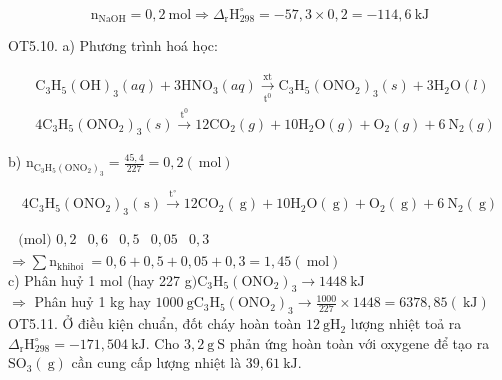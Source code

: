 \documentclass[10pt]{article}
\begin{document}
$$
\mathrm{n}_{\mathrm{NaOH}}=0,2 \mathrm{~mol} \Rightarrow \Delta_{\mathrm{r}} \mathrm{H}_{298}^{\circ}=-57,3 \times 0,2=-114,6 \mathrm{~kJ}
$$

OT5.10. a) Phương trình hoá học:

$$
\begin{aligned}
& \mathrm{C}_{3} \mathrm{H}_{5}(\mathrm{OH})_{3}(a q)+3 \mathrm{HNO}_{3}(a q) \xrightarrow[\mathrm{t}^{0}]{\mathrm{xt}} \mathrm{C}_{3} \mathrm{H}_{5}\left(\mathrm{ONO}_{2}\right)_{3}(s)+3 \mathrm{H}_{2} \mathrm{O}(l) \\
& 4 \mathrm{C}_{3} \mathrm{H}_{5}\left(\mathrm{ONO}_{2}\right)_{3}(s) \xrightarrow{\mathrm{t}^{0}} 12 \mathrm{CO}_{2}(g)+10 \mathrm{H}_{2} \mathrm{O}(g)+\mathrm{O}_{2}(g)+6 \mathrm{~N}_{2}(g)
\end{aligned}
$$

b) $\mathrm{n}_{\mathrm{C}_{3} \mathrm{H}_{5}\left(\mathrm{ONO}_{2}\right)_{3}}=\frac{45,4}{227}=0,2(\mathrm{~mol})$

$$
4 \mathrm{C}_{3} \mathrm{H}_{5}\left(\mathrm{ONO}_{2}\right)_{3}(\mathrm{~s}) \xrightarrow{\mathrm{t}^{\circ}} 12 \mathrm{CO}_{2}(\mathrm{~g})+10 \mathrm{H}_{2} \mathrm{O}(\mathrm{~g})+\mathrm{O}_{2}(\mathrm{~g})+6 \mathrm{~N}_{2}(\mathrm{~g})
$$

$\begin{array}{lllll}\text { (mol) } 0,2 & 0,6 & 0,5 & 0,05 & 0,3\end{array}$\\
$\Rightarrow \sum \mathrm{n}_{\text {khihoi }}=0,6+0,5+0,05+0,3=1,45(\mathrm{~mol})$\\
c) Phân huỷ 1 mol (hay 227 g$) \mathrm{C}_{3} \mathrm{H}_{5}\left(\mathrm{ONO}_{2}\right)_{3} \rightarrow 1448 \mathrm{~kJ}$\\
$\Rightarrow$ Phân huỷ 1 kg hay $1000 \mathrm{~g} \mathrm{C}_{3} \mathrm{H}_{5}\left(\mathrm{ONO}_{2}\right)_{3} \rightarrow \frac{1000}{227} \times 1448=6378,85(\mathrm{~kJ})$\\
OT5.11. Ở điều kiện chuẩn, đốt cháy hoàn toàn $12 \mathrm{~g} \mathrm{H}_{2}$ lượng nhiệt toả ra $\Delta_{\mathrm{r}} \mathrm{H}_{298}^{\circ}=-171,504 \mathrm{~kJ}$. Cho $3,2 \mathrm{~g} \mathrm{~S}$ phản ứng hoàn toàn với oxygene để tạo ra $\mathrm{SO}_{3}(\mathrm{~g})$ cần cung cấp lượng nhiệt là $39,61 \mathrm{~kJ}$.
\end{document}
